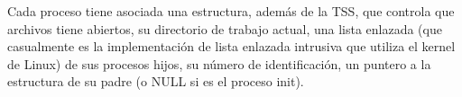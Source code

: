 Cada proceso tiene asociada una estructura, adem\'as de la TSS, que controla que archivos tiene abiertos, su directorio
de trabajo actual, una lista enlazada (que casualmente es la implementaci\'on de lista enlazada intrusiva que utiliza el kernel de Linux)
de sus procesos hijos, su n\'umero de identificaci\'on, un puntero a la estructura de su padre (o NULL si es el proceso init).
